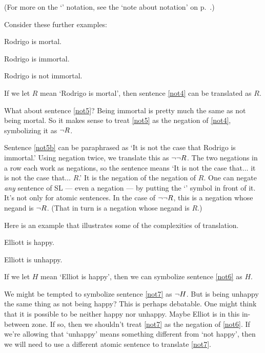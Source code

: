 
(For more on the `\metaA{}' notation, see the `note about notation' on p.\ \pageref{notationnote}.)

Consider these further examples:
\begin{earg}
\item[\ex{not4}] Rodrigo is mortal.
\item[\ex{not5}] Rodrigo is immortal.
\item[\ex{not5b}] Rodrigo is not immortal.
\end{earg}

If we let $R$ mean `Rodrigo is mortal', then sentence \ref{not4} can be translated as $R$.

What about sentence \ref{not5}? Being immortal is pretty much the same as not being mortal. So it makes sense to treat \ref{not5} as the negation of \ref{not4}, symbolizing it as $\neg{R}$.

Sentence \ref{not5b} can be paraphrased as `It is not the case that Rodrigo is immortal.' Using negation twice, we translate this as $\neg\neg R$. The two negations in a row each work as negations, so the sentence means `It is not the case that$\ldots$ it is not the case that$\ldots$ $R$.' It is the negation of the negation of $R$. One can negate \emph{any} sentence of SL --- even a negation --- by putting the `\enot{}' symbol in front of it. It's not only for atomic sentences. In the case of $\neg\neg R$, this is a negation whose negand is $\neg R$. (That in turn is a negation whose negand is $R$.)

Here is an example that illustrates some of the complexities of translation.
\begin{earg}
\item[\ex{not6}] Elliott is happy.
\item[\ex{not7}] Elliott is unhappy.
\end{earg}

If we let $H$ mean `Elliot is happy', then we can symbolize sentence \ref{not6} as $H$.

We might be tempted to symbolize sentence \ref{not7} as $\neg{H}$. But is being unhappy the same thing as not being happy? This is perhaps debatable. One might think that it is possible to be neither happy nor unhappy. Maybe Elliot is in this in-between zone. If so, then we shouldn't treat \ref{not7} as the negation of \ref{not6}. If we're allowing that `unhappy' means something different from `not happy', then we will need to use a different atomic sentence to translate \ref{not7}.

